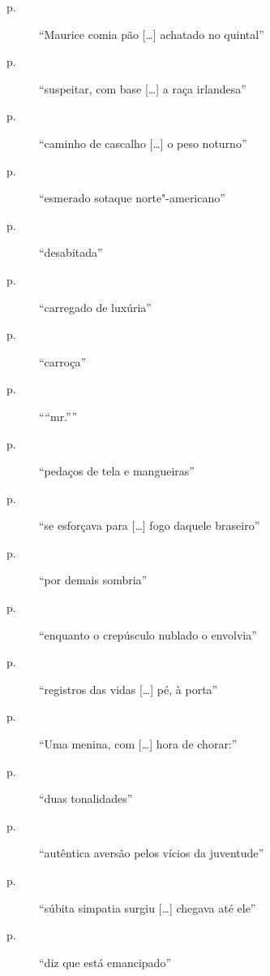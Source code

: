 \begin{description}
\item[p.~\pageref{maurice"-comia}]  ``Maurice comia pão [\ldots] achatado no quintal''

\item[p.~\pageref{suspeitar"-com}]  ``suspeitar, com base [\ldots] a raça irlandesa''

\item[p.~\pageref{caminho"-de}]  ``caminho de cascalho [\ldots] o peso noturno''

\item[p.~\pageref{esmerado"-sotaque}]  ``esmerado sotaque norte"-americano''

\item[p.~\pageref{desabitada}]  ``desabitada''

\item[p.~\pageref{carregado"-de}]  ``carregado de luxúria''

\item[p.~\pageref{carroca}]  ``carroça''

\item[p.~\pageref{mr}]  ``“mr.”''

\item[p.~\pageref{pedacos"-de}]  ``pedaços de tela e mangueiras''

\item[p.~\pageref{se"-esforcava}]  ``se esforçava para [\ldots] fogo daquele braseiro''

\item[p.~\pageref{por"-demais}]  ``por demais sombria''

\item[p.~\pageref{enquanto"-o}]  ``enquanto o crepúsculo nublado o envolvia''

\item[p.~\pageref{registros"-das}]  ``registros das vidas [\ldots] pé, à porta''

\item[p.~\pageref{uma"-menina}]  ``Uma menina, com [\ldots] hora de chorar:''

\item[p.~\pageref{duas"-tonalidades}]  ``duas tonalidades''

\item[p.~\pageref{autentica"-aversao}]  ``autêntica aversão pelos vícios da juventude''

\item[p.~\pageref{subita"-simpatia}]  ``súbita simpatia surgiu [\ldots] chegava até ele''

\item[p.~\pageref{diz"-que}]  ``diz que está emancipado''


\end{description}
